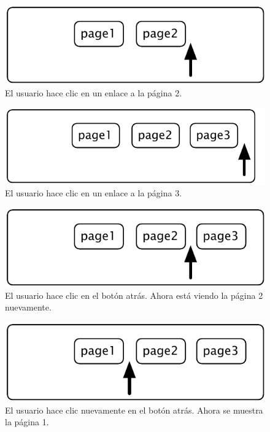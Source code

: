 \documentclass[a4paper,10pt,twoside]{book}
\begin{document}
{\begin{figure}[!ht]
\centerline{\includegraphics[scale=0.5]{page2Stef}}
\caption{El usuario hace clic en un enlace a la p\'agina 2.}
\vspace{.2in}
\end{figure}

\begin{figure}[!ht]
\centerline{\includegraphics[scale=0.5]{page3Stef}}
\caption{El usuario hace clic en un enlace a la p\'agina 3.}
\vspace{.2in}
\end{figure}

\begin{figure}[!ht]
\centerline{\includegraphics[scale=0.5]{page2_Stef}}
\caption{El usuario hace clic en el bot\'on atr\'as. Ahora est\'a viendo la p\'agina 2 nuevamente.}
\vspace{.2in}
\end{figure}

\begin{figure}[!ht]
\centerline{\includegraphics[scale=0.5]{page1_Stef}}
\caption{El usuario hace clic nuevamente en el bot\'on atr\'as. Ahora se muestra la p\'agina 1.}
\vspace{.2in}
\end{figure}

}
\end{document}
